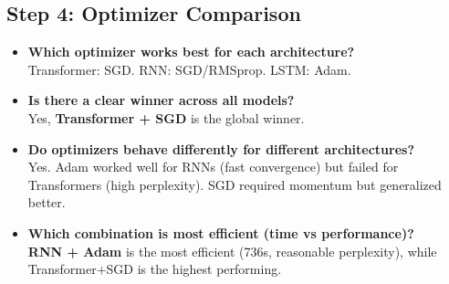 \documentclass[12pt,a4paper]{article}
\begin{document}
\subsection*{Step 4: Optimizer Comparison}
\begin{itemize}
    \item \textbf{Which optimizer works best for each architecture?} \\ Transformer: SGD. RNN: SGD/RMSprop. LSTM: Adam.
    \item \textbf{Is there a clear winner across all models?} \\ Yes, \textbf{Transformer + SGD} is the global winner.
    \item \textbf{Do optimizers behave differently for different architectures?} \\ Yes. Adam worked well for RNNs (fast convergence) but failed for Transformers (high perplexity). SGD required momentum but generalized better.
    \item \textbf{Which combination is most efficient (time vs performance)?} \\ \textbf{RNN + Adam} is the most efficient (736s, reasonable perplexity), while Transformer+SGD is the highest performing.
\end{itemize}
\end{document}
